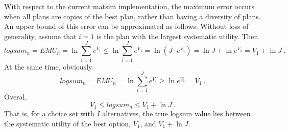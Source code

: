With respect to the current \gls{matsim} implementation, the maximum error occurs when all plans are copies of the best plan, rather than having a diversity of plans.
%
An upper bound of this error 
can be approximated as follows.  Without loss of 
generality, assume that $i=1$ is the plan with the largest systematic utility.  Then
\[
logsum_n = EMU_n = \ln \sum_{i=1}^{J} e^{V_{i}}
%
\le \ln \sum_{i=1}^{J} e^{V_{1}}
%
= \ln ( J \cdot e^{V_{1}} )
%
= \ln J + \ln e^{V_{1}}
%
= V_{1} + \ln J \ .
\]
At the same time, obviously
\[
logsum_n = EMU_n = \ln \sum_{i=1}^{J} e^{V_i} \ge \ln e^{V_1} = V_1 \ .
\]
Overal,
\[
V_1 \le logsum_n \le V_1 + \ln J \ .
\]
That is, for a choice set with $I$ alternatives, the true logsum value lies between the systematic utility of the best option, $V_1$, and $V_1 + \ln J$.








